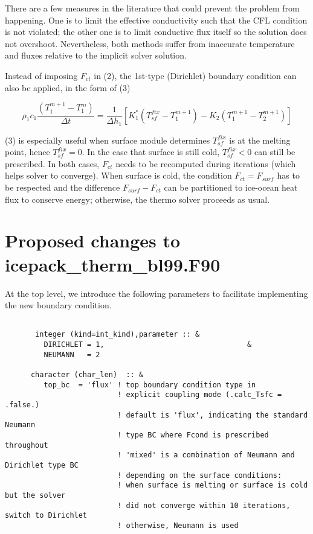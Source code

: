 \documentclass[10pt,letterpaper,oneside]{article}
\begin{document}
There are a few measures in the literature that could prevent the problem from happening. One is to limit the effective conductivity such that the CFL condition is not violated; the other one is to limit conductive flux itself so the solution does not overshoot. Nevertheless, both methods suffer from inaccurate temperature and fluxes relative to the implicit solver solution. 

Instead of imposing $F_{ct}$ in (2), the 1st-type (Dirichlet) boundary condition can also be applied, in the form of (3)

\begin{equation} 
\rho_{1}c_{1}\frac{\left( T^{m+1}_{1}-T^{m}_{1} \right)}{\Delta{t}}=\frac{1}{\Delta{h_{1}}} \left[ K^{*}_1  \left( T^{fix}_{sf}-T^{m+1}_{1} \right) - K_{2}  \left( T^{m+1}_{1}-T^{m+1}_{2} \right) \right] 
\end{equation}

(3) is especially useful when surface module determines $T^{fix}_{sf}$ is at the melting point,  hence $T^{fix}_{sf} = 0$. In the case that surface is still cold,  $T^{fix}_{sf} < 0$ can still be prescribed. In both cases, $F_{ct}$ needs to be recomputed during iterations (which helps solver to converge). When surface is cold, the condition $F_{ct} = F_{surf}$ has to be respected and the difference  $F_{surf} - F_{ct}$ can be partitioned to ice-ocean heat flux to conserve energy; otherwise, the thermo solver proceeds as usual. 
 
      



\section{Proposed changes to icepack\_therm\_bl99.F90}

At the top level, we introduce the following parameters to facilitate implementing the new boundary condition.
 
\begin{lstlisting}

       integer (kind=int_kind),parameter :: &
         DIRICHLET = 1,                                 &
         NEUMANN   = 2      
         
      character (char_len)  :: &
         top_bc  = 'flux' ! top boundary condition type in 
                          ! explicit coupling mode (.calc_Tsfc = .false.)
                          ! default is 'flux', indicating the standard Neumann 
                          ! type BC where Fcond is prescribed throughout 
                          ! 'mixed' is a combination of Neumann and Dirichlet type BC
                          ! depending on the surface conditions:
                          ! when surface is melting or surface is cold but the solver
                          ! did not converge within 10 iterations, switch to Dirichlet
                          ! otherwise, Neumann is used
 
\end{lstlisting}
\end{document}
